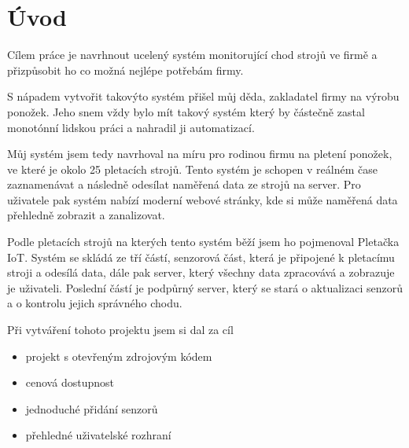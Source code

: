 \chapter*{Úvod}


Cílem práce je navrhnout ucelený systém monitorující chod strojů ve firmě a přizpůsobit ho co možná nejlépe potřebám firmy.

S nápadem vytvořit takovýto systém přišel můj děda, zakladatel firmy na výrobu ponožek.
Jeho snem vždy bylo mít takový systém který by částečně zastal monotónní lidskou práci a nahradil ji automatizací.

Můj systém jsem tedy navrhoval na míru pro rodinou firmu na pletení ponožek, ve které je okolo 25 pletacích strojů. 
Tento systém je schopen v reálném čase zaznamenávat a následně odesílat naměřená data ze strojů na server. 
Pro uživatele pak systém nabízí moderní webové stránky, kde si může naměřená data přehledně zobrazit a zanalizovat.

Podle pletacích strojů na kterých tento systém běží jsem ho pojmenoval Pletačka IoT. 
Systém se skládá ze tří částí, senzorová část, která je připojené k pletacímu stroji a odesílá data, dále pak server, který všechny data zpracovává a zobrazuje je uživateli.
Poslední částí je podpůrný server, který se stará o aktualizaci senzorů a o kontrolu jejich správného chodu.



Při vytváření tohoto projektu jsem si dal za cíl
\begin{itemize}
    \item projekt s otevřeným zdrojovým kódem
    \item cenová dostupnost
    \item jednoduché přidání senzorů
    \item přehledné uživatelské rozhraní
\end{itemize}
 




\newpage

